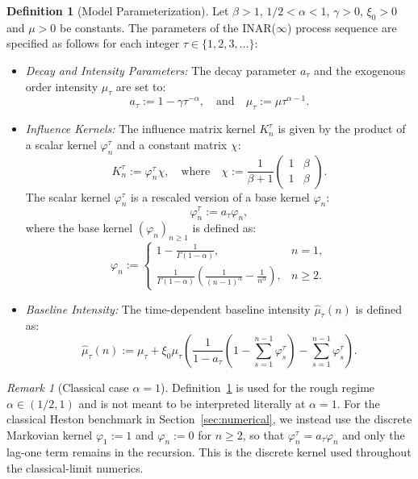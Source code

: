 \documentclass[letterpaper]{article}
\numberwithin{equation}{section}
\theoremstyle{definition}
\newtheorem{definition}[theorem]{Definition}
\theoremstyle{remark}
\newtheorem{remark}[theorem]{Remark}
\begin{document}
\begin{definition}[Model Parameterization]\label{def:params}
Let $\beta>1$, $1/2<\alpha<1$, $\gamma>0$, $\xi_0>0$ and $\mu>0$ be constants. The parameters of the INAR($\infty$) process sequence are specified as follows for each integer $\tau \in \{1, 2, 3, \dots\}$:
\begin{itemize}
    \item \textit{Decay and Intensity Parameters:} The decay parameter $a_\tau$ and the exogenous order intensity $\mu_\tau$ are set to:
    \begin{equation}\label{a:tau:mu:tau}
        a_\tau:=1-\gamma \tau^{-\alpha}, \quad \text{and} \quad \mu_{\tau}:=\mu\tau^{\alpha-1}.
    \end{equation}
    
    \item \textit{Influence Kernels:} The influence matrix kernel $K_n^\tau$ is given by the product of a scalar kernel $\varphi_n^\tau$ and a constant matrix $\chi$:
    \[
        K_{n}^{\tau}:=\varphi_n^{\tau} \chi, \quad \text{where} \quad \chi:=\frac1{\beta+1}\left(
        \begin{matrix}
          1 & \beta\\
          1 & \beta
        \end{matrix}
        \right).
    \]
    The scalar kernel $\varphi_n^\tau$ is a rescaled version of a base kernel $\varphi_n$:
    \[
        \varphi_n^{\tau}:=a_{\tau}\varphi_n,
    \]
    where the base kernel $(\varphi_n)_{n\ge 1}$ is defined as:
    \[
      \varphi_n:=
      \begin{cases}
        1-\frac1{\Gamma(1-\alpha)}, &n=1,\\
        \frac1{\Gamma(1-\alpha)}\left( \frac1{(n-1)^\alpha}-\frac1{n^\alpha}\right), &n\ge2.
      \end{cases}
    \]
    
    \item \textit{Baseline Intensity:} The time-dependent baseline intensity $\hat\mu_{\tau}(n)$ is defined as:
    \[
      \hat \mu_{\tau}(n):=\mu_{\tau}+\xi_0 \mu_{\tau}\left( \frac1{1-a_{\tau}}\left( 1-\sum_{s=1}^{n-1}\varphi_s^{\tau} \right)-\sum_{s=1}^{n-1}\varphi_s^{\tau} \right).
    \]
\end{itemize}
\end{definition}

\begin{remark}[Classical case $\alpha=1$]\label{rem:alpha-one-kernel}
Definition~\ref{def:params} is used for the rough regime $\alpha\in(1/2,1)$ and is not meant to be interpreted literally at $\alpha=1$. For the classical Heston benchmark in Section~\ref{sec:numerical}, we instead use the discrete Markovian kernel $\varphi_1:=1$ and $\varphi_n:=0$ for $n\ge2$, so that $\varphi_n^\tau=a_\tau\varphi_n$ and only the lag-one term remains in the recursion. This is the discrete kernel used throughout the classical-limit numerics.
\end{remark}
\end{document}
